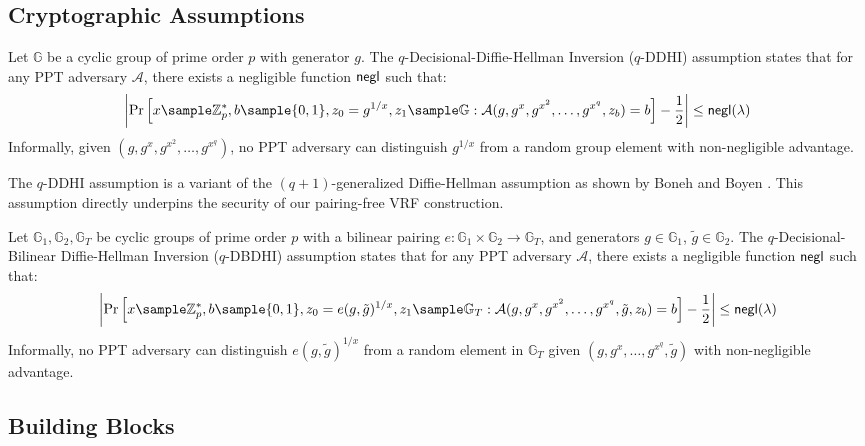 \subsection{Cryptographic Assumptions}

\begin{definition}
Let $\mathbb{G}$ be a cyclic group of prime order $p$ with generator $g$. The $q$-Decisional-Diffie-Hellman Inversion ($q$-DDHI) \cite{mitsunari_new_2002} assumption states that for any PPT adversary $\mathcal{A}$, there exists a negligible function $\mathsf{negl}$ such that:
\[
\left|\Pr\left[ x \sample \Zp^*, b \sample \{0,1\}, z_0 = g^{1/x}, z_1 \sample \G : \mathcal{A}(g, g^x, g^{x^2}, \ldots, g^{x^q}, z_b) = b \right] - \frac{1}{2}\right| \leq \negl(\lambda)
\]
Informally, given $(g, g^x, g^{x^2}, \ldots, g^{x^q})$, no PPT adversary can distinguish $g^{1/x}$ from a random group element with non-negligible advantage.
\end{definition}

\begin{remark}
The $q$-DDHI assumption is a variant of the $(q+1)$-generalized Diffie-Hellman assumption as shown by Boneh and Boyen \cite{kanade_efficient_2004}. This assumption directly underpins the security of our pairing-free VRF construction.
\end{remark}

\begin{definition}
Let $\mathbb{G}_1, \mathbb{G}_2, \mathbb{G}_T$ be cyclic groups of prime order $p$ with a bilinear pairing $e: \mathbb{G}_1 \times \mathbb{G}_2 \to \mathbb{G}_T$, and generators $g \in \mathbb{G}_1$, $\tilde{g} \in \mathbb{G}_2$. The $q$-Decisional-Bilinear Diffie-Hellman Inversion ($q$-DBDHI) assumption states that for any PPT adversary $\mathcal{A}$, there exists a negligible function $\mathsf{negl}$ such that:
\[
\left| \Pr\left[ x \sample \Z_p^*, b \sample \{0,1\}, z_0 = e(g, \tilde{g})^{1/x}, z_1 \sample \G_T : \mathcal{A}(g, g^x, g^{x^2}, \ldots, g^{x^q}, \tilde{g}, z_b) = b \right] - \frac{1}{2}\right| \leq \negl(\lambda)
\]
Informally, no PPT adversary can distinguish $e(g, \tilde{g})^{1/x}$ from a random element in $\mathbb{G}_T$ given $(g, g^x, \ldots, g^{x^q}, \tilde{g})$ with non-negligible advantage.
\end{definition}


\subsection{Building Blocks}

